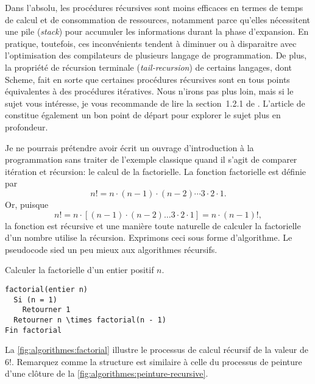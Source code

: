 Dans l'absolu, les procédures récursives sont moins efficaces en
termes de temps de calcul et de consommation de ressources, notamment
parce qu'elles nécessitent une pile (\emph{stack}) pour
accumuler les informations durant la phase d'expansion. En pratique,
toutefois, ces inconvénients tendent à diminuer ou à disparaitre avec
l'optimisation des compilateurs de plusieurs langage de programmation.
De plus, la propriété de
récursion terminale
(\emph{tail-recursion}) de certains langages, dont
Scheme, fait en sorte que certaines procédures
récursives sont en tous points équivalentes à des procédures
itératives. Nous n'irons pas plus loin, mais si le sujet vous
intéresse, je vous recommande de lire la section~1.2.1 de
\citet{Sussman:scheme:1996}. L'article de
\citet{Wikipedia:Recursion_terminale} constitue également un bon point
de départ pour explorer le sujet plus en profondeur.

Je ne pourrais prétendre avoir écrit un ouvrage d'introduction à la
programmation sans traiter de l'exemple classique quand il s'agit de
comparer itération et
récursion: le calcul de la
factorielle. La fonction factorielle est définie
par
\begin{equation*}
  n! = n \cdot (n - 1) \cdot (n - 2) \cdots 3 \cdot 2 \cdot 1.
\end{equation*}
Or, puisque
\begin{equation*}
  n! = n \cdot [(n - 1) \cdot (n - 2) \dots 3 \cdot 2 \cdot 1] =
  n \cdot (n - 1)!,
\end{equation*}
la fonction est récursive et une manière toute naturelle de calculer
la factorielle d'un nombre utilise la récursion. Exprimons ceci sous
forme d'algorithme. Le pseudocode sied un peu mieux aux algorithmes
récursifs.

\begin{algorithme}
  Calculer la factorielle d'un entier positif $n$.
  \begin{Schunk}
\begin{Verbatim}[commandchars=\\\{\}]
factorial(entier n)
  Si (n = 1)
    Retourner 1
  Retourner n \times factorial(n - 1)
Fin factorial
\end{Verbatim}
  \end{Schunk}
\end{algorithme}

La \autoref{fig:algorithmes:factorial} illustre le processus de calcul
récursif de la valeur de $6!$. Remarquez comme la structure est
similaire à celle du processus de peinture d'une clôture de la
\autoref{fig:algorithmes:peinture-recursive}.

